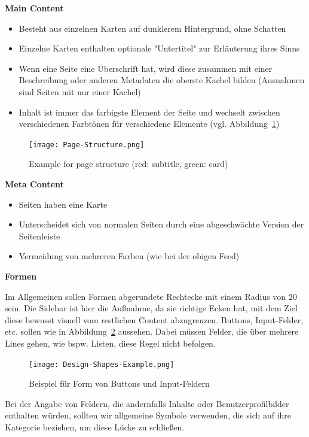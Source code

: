 \textbf{Main Content}
\begin{itemize}
    \item Besteht aus einzelnen Karten auf dunklerem Hintergrund, ohne Schatten
    \item Einzelne Karten enthalten optionale "Untertitel" zur Erläuterung ihres Sinns
    \item Wenn eine Seite eine Überschrift hat, wird diese zusammen mit einer Beschreibung oder anderen Metadaten die oberste Kachel bilden (Ausnahmen sind Seiten mit nur einer Kachel)
    \item Inhalt ist immer das farbigste Element der Seite und wechselt zwischen verschiedenen Farbtönen für verschiedene Elemente (vgl. Abbildung~\ref{fig:Page-Structure-Example})
\end{itemize}

\begin{figure}
    \texttt{[image: Page-Structure.png]}
    \caption{Example for page structure (red: subtitle, green: card)}
    \label{fig:Page-Structure-Example}
\end{figure}

\textbf{Meta Content}
\begin{itemize}
    \item Seiten haben eine Karte
    \item Unterscheidet sich von normalen Seiten durch eine abgeschwächte Version der Seitenleiste
    \item Vermeidung von mehreren Farben (wie bei der obigen Feed)
\end{itemize}
 
\textbf{Formen}

Im Allgemeinen sollen Formen abgerundete Rechtecke mit einem Radius von 20 sein. Die Sidebar ist hier die Außnahme, da sie richtige Ecken hat, 
mit dem Ziel diese bewusst visuell vom restlichen Content abzugrenzen.
Buttons, Input-Felder, etc. sollen wie in Abbildung~\ref{fig:Design-Shapes-Example} aussehen. 
Dabei müssen Felder, die über mehrere Lines gehen, wie bspw. Listen, diese Regel nicht befolgen.

\begin{figure}[H]
    \texttt{[image: Design-Shapes-Example.png]}
    \caption{Beispiel für Form von Buttons und Input-Feldern}
    \label{fig:Design-Shapes-Example}
\end{figure}

Bei der Angabe von Feldern, die andernfalls Inhalte oder Benutzerprofilbilder enthalten würden,
sollten wir allgemeine Symbole verwenden, die sich auf ihre Kategorie beziehen, um diese Lücke zu schließen.

